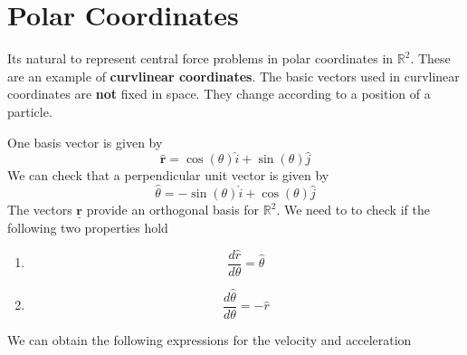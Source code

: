 \section{Polar Coordinates}
Its natural to represent central force problems in polar coordinates in \(
\mathbb{R}^2 \). These are an example of \textbf{curvlinear coordinates}. The
basic vectors used in curvlinear coordinates are \textbf{not} fixed in space.
They change according to a position of a particle. 
\begin{example}
One basis vector is given by
\[
  \hat{ \textbf{r}} = \cos(\theta) \hat{i} + \sin(\theta) \hat{j}
\]
We can check that a perpendicular unit vector is given by
\[ 
  \hat{\theta} = - \sin(\theta) \hat{i} + \cos(\theta) \hat{j}
\]
The vectors \( \underline{ \textbf{r}} \) provide an orthogonal basis for \(
\mathbb{R} ^2 \). We need to to check if the following two properties hold
\begin{enumerate}
  \item \[\frac{d \hat{r}}{d\theta} = \hat{\theta}\]
  \item \[\frac{d \hat{\theta}}{d\theta} = -\hat{r}\]
\end{enumerate}

We can obtain the following expressions for the velocity and acceleration


\end{example}
